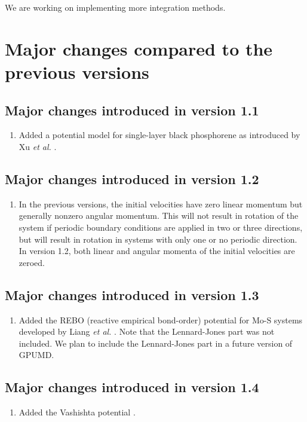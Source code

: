\documentclass[12pt,a4paper]{report}
\begin{document}
We are working on implementing more integration methods.

\section{Major changes compared to the previous versions}

\subsection{Major changes introduced in version 1.1}
\begin{enumerate}
\item Added a potential model for single-layer black phosphorene as introduced by Xu \textit{et al.} \cite{xu2015jap}.
\end{enumerate}

\subsection{Major changes introduced in version 1.2}
\begin{enumerate}
\item In the previous versions, the initial velocities have zero linear momentum but generally nonzero angular momentum. This will not result in rotation of the system if periodic boundary conditions are applied in two or three directions, but will result in rotation in systems with only one or no periodic direction. In version 1.2, both linear and angular momenta of the initial velocities are zeroed.
\end{enumerate}

\subsection{Major changes introduced in version 1.3}
\begin{enumerate}
\item Added the REBO (reactive empirical bond-order) potential for Mo-S systems developed by Liang \textit{et al.} \cite{liang2009prb,liang2012prb_erratum}. Note that the Lennard-Jones part was not included. We plan to include the Lennard-Jones part in a future version of GPUMD. 
\end{enumerate}


\subsection{Major changes introduced in version 1.4}
\begin{enumerate}
\item Added the Vashishta potential \cite{vashishta2007jap}.
\end{enumerate}
\end{document}
